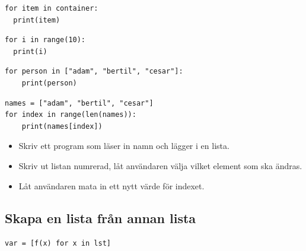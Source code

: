 \begin{frame}[fragile]
  \begin{verbatim}
for item in container:
  print(item)
  \end{verbatim}
\end{frame}

\begin{frame}[fragile]
  \begin{example}
    \begin{verbatim}
for i in range(10):
  print(i)
    \end{verbatim}
  \end{example}

  \pause

  \begin{example}
    \begin{verbatim}
for person in ["adam", "bertil", "cesar"]:
    print(person)
    \end{verbatim}
  \end{example}

  \pause

  \begin{example}
    \begin{verbatim}
names = ["adam", "bertil", "cesar"]
for index in range(len(names)):
    print(names[index])
    \end{verbatim}
  \end{example}
\end{frame}

\begin{frame}[fragile]
  \begin{exercise}[modlist.py]
    \begin{itemize}
      \item Skriv ett program som läser in namn och lägger i en 
        lista.
      \item Skriv ut listan numrerad, låt användaren välja vilket element som 
        ska ändras.
      \item Låt användaren mata in ett nytt värde för indexet.
    \end{itemize}
  \end{exercise}
\end{frame}

\subsection{Skapa en lista från annan lista}

\begin{frame}[fragile]
  \texttt{var = [f(x) for x in lst]}
\end{frame}

